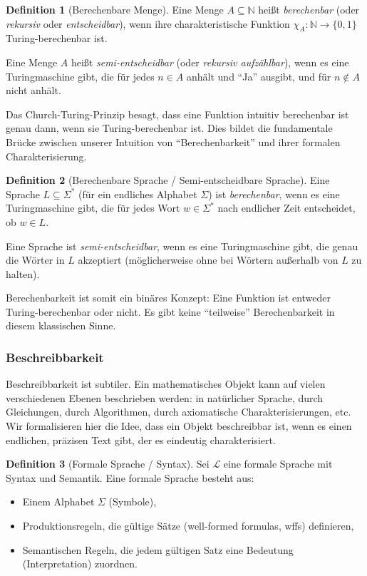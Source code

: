 \documentclass[a4paper,12pt]{article}
\theoremstyle{definition}
\newtheorem{definition}{Definition}
\begin{document}
\begin{definition}[Berechenbare Menge]
Eine Menge $A \subseteq \mathbb{N}$ heißt \textit{berechenbar} (oder \textit{rekursiv} oder \textit{entscheidbar}), wenn ihre charakteristische Funktion $\chi_A : \mathbb{N} \to \{0,1\}$ Turing-berechenbar ist.

Eine Menge $A$ heißt \textit{semi-entscheidbar} (oder \textit{rekursiv aufzählbar}), wenn es eine Turingmaschine gibt, die für jedes $n \in A$ anhält und ``Ja'' ausgibt, und für $n \notin A$ nicht anhält.
\end{definition}

Das Church-Turing-Prinzip besagt, dass eine Funktion intuitiv berechenbar ist genau dann, wenn sie Turing-berechenbar ist. Dies bildet die fundamentale Brücke zwischen unserer Intuition von ``Berechenbarkeit'' und ihrer formalen Charakterisierung.

\begin{definition}[Berechenbare Sprache / Semi-entscheidbare Sprache]
Eine Sprache $L \subseteq \Sigma^*$ (für ein endliches Alphabet $\Sigma$) ist \textit{berechenbar}, wenn es eine Turingmaschine gibt, die für jedes Wort $w \in \Sigma^*$ nach endlicher Zeit entscheidet, ob $w \in L$.

Eine Sprache ist \textit{semi-entscheidbar}, wenn es eine Turingmaschine gibt, die genau die Wörter in $L$ akzeptiert (möglicherweise ohne bei Wörtern außerhalb von $L$ zu halten).
\end{definition}

Berechenbarkeit ist somit ein binäres Konzept: Eine Funktion ist entweder Turing-berechenbar oder nicht. Es gibt keine ``teilweise'' Berechenbarkeit in diesem klassischen Sinne.

\subsubsection{Beschreibbarkeit}

Beschreibbarkeit ist subtiler. Ein mathematisches Objekt kann auf vielen verschiedenen Ebenen beschrieben werden: in natürlicher Sprache, durch Gleichungen, durch Algorithmen, durch axiomatische Charakterisierungen, etc. Wir formalisieren hier die Idee, dass ein Objekt beschreibbar ist, wenn es einen endlichen, präzisen Text gibt, der es eindeutig charakterisiert.

\begin{definition}[Formale Sprache / Syntax]
Sei $\mathcal{L}$ eine formale Sprache mit Syntax und Semantik. Eine formale Sprache besteht aus:
\begin{itemize}
\item Einem Alphabet $\Sigma$ (Symbole),
\item Produktionsregeln, die gültige Sätze (well-formed formulas, wffs) definieren,
\item Semantischen Regeln, die jedem gültigen Satz eine Bedeutung (Interpretation) zuordnen.
\end{itemize}
\end{definition}
\end{document}
